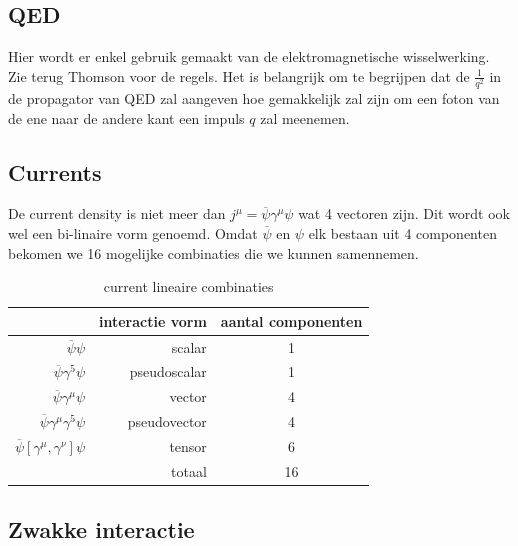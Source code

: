 \documentclass[../main.tex]{subfiles}
\begin{document}
\subsection{QED}%
\label{sub:qed}

Hier wordt er enkel gebruik gemaakt van de elektromagnetische wisselwerking. Zie terug Thomson voor de regels. Het is belangrijk om te begrijpen dat de $\frac{1}{q^2}$ in de propagator van QED zal aangeven hoe gemakkelijk zal zijn om een foton van de ene naar de andere kant een impuls $q$ zal meenemen.

\subsection{Currents}%
\label{sub:currents}

De current density is niet meer dan $j^\mu = \overline \psi \gamma^\mu \psi$ wat 4 vectoren zijn. Dit wordt ook wel een bi-linaire vorm genoemd. Omdat $\overline \psi$ en $\psi$ elk bestaan uit 4 componenten bekomen we 16 mogelijke combinaties die we kunnen samennemen.
\begin{table}[h]
    \centering
    \caption{current lineaire combinaties}
    \label{tab:cur_lin_comb}
    \begin{tabular}{rrc}
                                                    & interactie vorm   & aantal componenten    \\
        \hline
        $\overline \psi \psi$                       & scalar            & 1                     \\
        $\overline \psi\gamma^5 \psi$               & pseudoscalar      & 1                     \\
        $\overline \psi\gamma^\mu \psi$             & vector            & 4                     \\
        $\overline \psi\gamma^\mu\gamma^5 \psi$     & pseudovector      & 4                     \\
        $\overline \psi[\gamma^\mu,\gamma^\nu] \psi$& tensor            & 6                     \\
                                                    & totaal            & 16                    \\
    \end{tabular}
\end{table}

\subsection{Zwakke interactie}%
\label{sub:zwakke_interactie}
\end{document}
